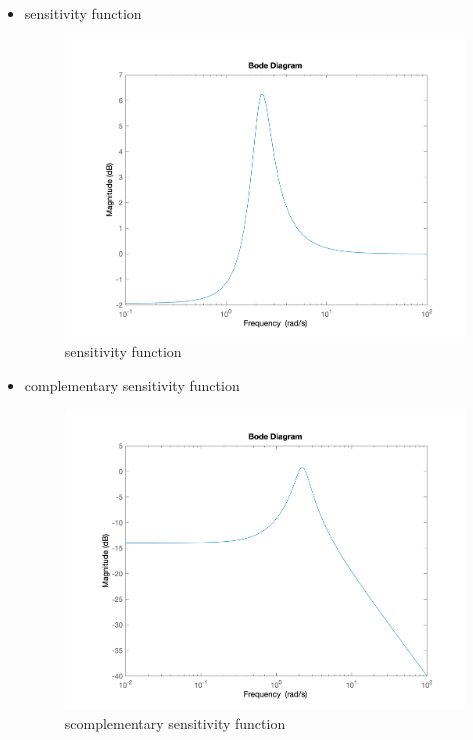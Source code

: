 \begin{itemize}
\begin{figure}[H]
	\end{figure}
	\item sensitivity function
	\begin{figure}[H]
		\caption{sensitivity function}
		\centering
		\includegraphics[width=12cm]{../Figure/Q1/Q1_a/s_bode.png}
	\end{figure}
	\item complementary sensitivity function
	\begin{figure}[H]
		\caption{scomplementary sensitivity function}
		\centering
		\includegraphics[width=12cm]{../Figure/Q1/Q1_a/t_bode.png}
	\end{figure}
\end{itemize}